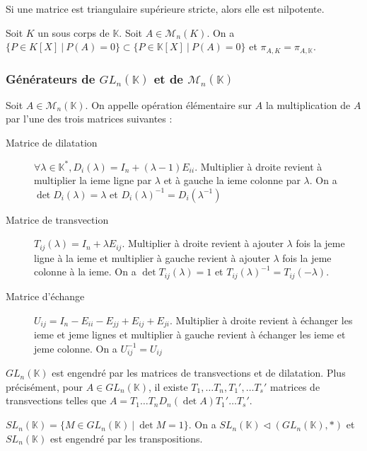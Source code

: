 \begin{prop} Si une matrice est triangulaire supérieure stricte, alors elle est nilpotente.
\end{prop}

\begin{prop} Soit $K$ un sous corps de $\mathbb{K}$. Soit $A\in\mathscr{M}_n(K)$. On a$\{P\in K[X]\ |\ P(A)=0\}\subset\{P\in\mathbb{K}[X]\ |\ P(A)=0\}$ et $\pi_{A,K} = \pi_{A,\mathbb{K}}$.
\end{prop}

\subsubsection{Générateurs de $GL_n(\mathbb{K})$ et de $\mathscr{M}_n(\mathbb{K})$}
\begin{defi} Soit $A\in\mathscr{M}_n(\mathbb{K})$. On appelle opération élémentaire sur $A$ la multiplication de $A$ par l'une des trois matrices suivantes :\begin{description}
    \item[Matrice de dilatation] $\forall \lambda\in\mathbb{K}^*, D_i(\lambda) = I_n + (\lambda-1)E_{ii}$. Multiplier à droite revient à multiplier la ieme ligne par $\lambda$ et à gauche la ieme colonne par $\lambda$. On a $\det D_i(\lambda) = \lambda$ et $D_i(\lambda)^{-1}=D_i(\lambda^{-1})$
    \item[Matrice de transvection] $T_{ij}(\lambda) = I_n + \lambda E_{ij}$. Multiplier à droite revient à ajouter $\lambda$ fois la jeme ligne à la ieme et multiplier à gauche revient à ajouter $\lambda$ fois la jeme colonne à la ieme. On a $\det T_{ij}(\lambda) = 1$ et $T_{ij}(\lambda)^{-1} = T_{ij}(-\lambda)$.
    \item[Matrice d'échange] $U_{ij} = I_n - E_{ii} - E_{jj} + E_{ij} + E_{ji}$. Multiplier à droite revient à échanger les ieme et jeme lignes et multiplier à gauche revient à échanger les ieme et jeme colonne. On a $U_{ij}^{-1} = U_{ij}$
\end{description}\end{defi}

\begin{theo} $GL_n(\mathbb{K})$ est engendré par les matrices de transvections et de dilatation. Plus précisément, pour $A\in GL_n(\mathbb{K})$, il existe $T_1, \ldots T_n, T_1', \ldots T_s'$ matrices de transvections telles que $A=T_1\ldots T_nD_n(\det A)T_1'\ldots T_s'$.
\end{theo}

\begin{defi} $SL_n(\mathbb{K}) = \{M\in GL_n(\mathbb{K})\ |\ \det M = 1\}$. On a $SL_n(\mathbb{K})\lhd (GL_n(\mathbb{K}), *)$ et $SL_n(\mathbb{K})$ est engendré par les transpositions.
\end{defi}

